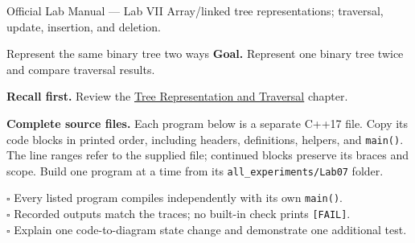 
\begin{sourcealignment}{Official Lab Manual --- Lab VII}
Array/linked tree representations; traversal, update, insertion, and deletion.
\end{sourcealignment}

\begin{labproject}{Represent the same binary tree two ways}
\textbf{Goal.} Represent one binary tree twice and compare traversal results.

\textbf{Recall first.} Review the \hyperref[ch:trees-i]{Tree Representation and Traversal} chapter.

\textbf{Complete source files.} Each program below is a separate C++17 file.
Copy its code blocks in printed order, including headers, definitions, helpers, and \texttt{main()}.
The line ranges refer to the supplied file; continued blocks preserve its braces and scope.
Build one program at a time from its \texttt{all\_experiments/Lab07} folder.


\end{labproject}

\begin{verification}
$\square$ Every listed program compiles independently with its own \texttt{main()}.\\
$\square$ Recorded outputs match the traces; no built-in check prints \texttt{[FAIL]}.\\
$\square$ Explain one code-to-diagram state change and demonstrate one additional test.
\end{verification}

